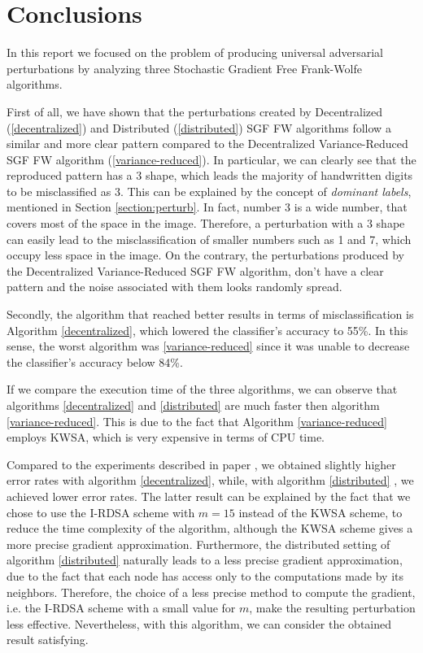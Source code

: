 \section{Conclusions}
In this report we focused on the problem of producing universal adversarial perturbations by analyzing three
Stochastic Gradient Free Frank-Wolfe algorithms.

First of all, we have shown that the perturbations created by Decentralized (\ref{decentralized}) and Distributed (\ref{distributed})
SGF FW algorithms follow a similar and more clear pattern compared to the Decentralized Variance-Reduced SGF FW
algorithm (\ref{variance-reduced}). In particular, we can clearly see that the reproduced pattern has a 3 shape, which
leads the majority of handwritten digits to be misclassified as 3. This can be explained by the concept of \textit{dominant labels},
mentioned in Section \ref{section:perturb}. In fact, number 3 is a wide number, that covers most of the space in the image. Therefore, a
perturbation with a 3 shape can easily lead to the misclassification of smaller numbers such as 1 and 7, which occupy
less space in the image. On the contrary, the perturbations produced by the Decentralized Variance-Reduced SGF FW algorithm,
don't have a clear pattern and the noise associated with them looks randomly spread.

Secondly, the algorithm that reached better results in terms of misclassification is Algorithm \ref{decentralized},
which lowered the classifier's accuracy to 55\%. In this sense, the worst algorithm was \ref{variance-reduced} since
it was unable to decrease the classifier's accuracy below 84\%.

If we compare the execution time of the three algorithms, we can observe that algorithms \ref{decentralized} and \ref{distributed}
are much faster then algorithm \ref{variance-reduced}. This is due to the fact that Algorithm \ref{variance-reduced}
employs KWSA, which is very expensive in terms of CPU time.

Compared to the experiments described in paper \cite{A3}, we obtained slightly higher error rates with algorithm
\ref{decentralized}, while, with algorithm \ref{distributed} , we achieved lower error rates. The latter result can be
explained by the fact that we chose to use the I-RDSA scheme with $m=15$ instead of the KWSA scheme, to reduce the time
complexity of the algorithm, although the KWSA scheme gives a more precise gradient approximation. Furthermore, the
distributed setting of algorithm \ref{distributed} naturally leads to a less precise gradient approximation, due to the
fact that each node has access only to the computations made by its neighbors. Therefore, the choice of a less precise
method to compute the gradient, i.e. the I-RDSA scheme with a small value for $m$, make the resulting perturbation
less effective. Nevertheless, with this algorithm, we can consider the obtained result satisfying.


